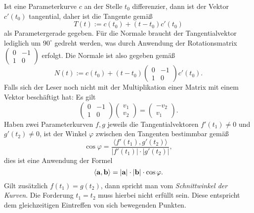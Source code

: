 Ist eine Parameterkurve $c$ an der Stelle $t_0$ differenzier,
dann ist der Vektor $c'(t_0)$ tangential, daher ist die Tangente
gemäß
\begin{equation}
T(t) := c(t_0)+(t-t_0)c'(t_0)
\end{equation}
als Parametergerade gegeben. Für die Normale braucht der
Tangentialvektor lediglich um $90^\circ$ gedreht werden,
was durch Anwendung der Rotationsmatrix
$(\begin{smallmatrix}0 & -1\\ 1 & 0\end{smallmatrix})$
erfolgt. Die Normale ist also gegeben gemäß
\begin{equation}
N(t) := c(t_0)+(t-t_0)\begin{pmatrix}0 & -1\\ 1 & 0\end{pmatrix}c'(t_0).
\end{equation}
Falls sich der Leser noch nicht mit der Multiplikation einer
Matrix mit einem Vektor beschäftigt hat: Es gilt
\begin{equation}
\begin{pmatrix}
0 & -1\\ 1 & 0
\end{pmatrix}
\begin{pmatrix}
v_1\\ v_2
\end{pmatrix}
= \begin{pmatrix}
-v_2\\ v_1
\end{pmatrix}.
\end{equation}
Haben zwei Parameterkurven $f,g$ jeweils die Tangentialvektoren
$f'(t_1)\ne 0$ und $g'(t_2)\ne 0$, ist der Winkel $\varphi$ zwischen
den Tangenten bestimmbar gemäß
\begin{equation}
\cos\varphi = \frac{\langle f'(t_1),g'(t_2)\rangle}{|f'(t_1)|\cdot |g'(t_2)|},
\end{equation}
dies ist eine Anwendung der Formel
\[\langle\mathbf{a},\mathbf{b}\rangle = |\mathbf{a}|\cdot|\mathbf{b}|\cdot\cos\varphi.\]
Gilt zusätzlich $f(t_1)=g(t_2)$, dann spricht man vom
\emph{Schnittwinkel der Kurven}. Die Forderung $t_1=t_2$ muss hierbei
nicht erfüllt sein. Diese entspricht dem gleichzeitigen Eintreffen
von sich bewegenden Punkten.


